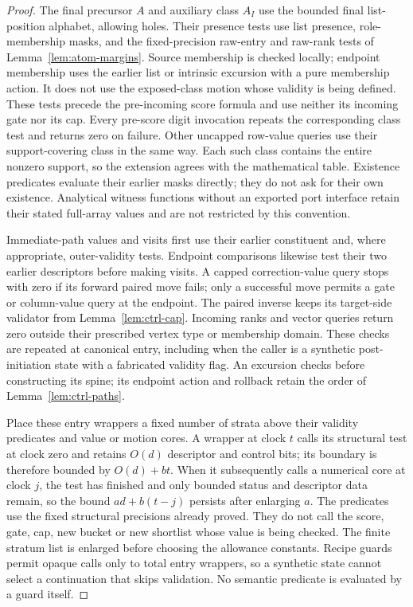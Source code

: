 \begin{proof}
The final precursor $A$ and auxiliary class $A_I$ use the bounded final
list-position alphabet, allowing holes. Their presence tests use list
presence, role-membership masks, and the fixed-precision raw-entry and
raw-rank tests of Lemma~\ref{lem:atom-margins}. Source membership is
checked locally; endpoint membership uses the earlier list or intrinsic
excursion with a pure membership action. It does not use the exposed-class
motion whose validity is being defined. These tests precede the
pre-incoming score formula and use neither its incoming gate nor its
cap. Every pre-score digit invocation repeats the corresponding class
test and returns zero on failure. Other uncapped row-value queries use
their support-covering class in the same way. Each such class contains
the entire nonzero support, so the extension agrees with the mathematical
table. Existence predicates evaluate their earlier masks directly;
they do not ask for their own existence. Analytical witness functions
without an exported port interface retain their stated full-array
values and are not restricted by this convention.

Immediate-path values and visits first use their earlier constituent
and, where appropriate, outer-validity tests. Endpoint comparisons
likewise test their two earlier descriptors before making visits.
A capped correction-value query stops with zero if its forward paired
move fails; only a successful move permits a gate or column-value query
at the endpoint. The paired inverse keeps its target-side validator
from Lemma~\ref{lem:ctrl-cap}. Incoming ranks and vector queries return
zero outside their prescribed vertex type or membership domain. These
checks are repeated at canonical entry, including when the caller is a
synthetic post-initiation state with a fabricated validity flag.
An excursion checks before constructing its spine; its endpoint action
and rollback retain the order of Lemma~\ref{lem:ctrl-paths}.

Place these entry wrappers a fixed number of strata above their
validity predicates and value or motion cores. A wrapper at clock $t$
calls its structural test at clock zero and retains $O(d)$ descriptor
and control bits; its boundary is therefore bounded by $O(d)+bt$.
When it subsequently calls a numerical core at clock $j$, the test has
finished and only bounded status and descriptor data remain, so the
bound $ad+b(t-j)$ persists after enlarging $a$. The predicates use the
fixed structural precisions already proved. They do not call the score,
gate, cap, new bucket or new shortlist whose value is being checked.
The finite stratum list is enlarged before choosing the allowance
constants. Recipe guards permit opaque calls only to total entry
wrappers, so a synthetic state cannot select a continuation that skips
validation. No semantic predicate is evaluated by a guard itself.


\end{proof}
